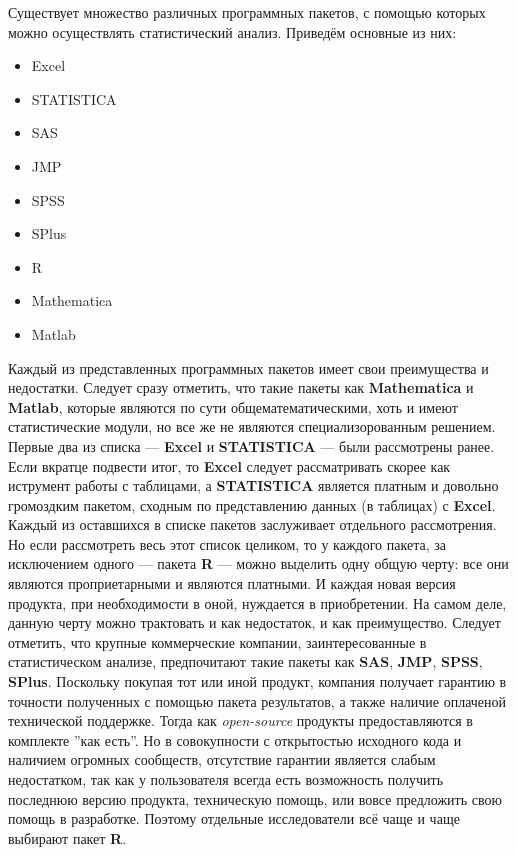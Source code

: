 Существует множество различных программных пакетов, с помощью которых можно осуществлять статистический анализ. Приведём основные из них:
\begin{itemize}
\item Excel
\item STATISTICA
\item SAS
\item JMP
\item SPSS
\item SPlus
\item R
\item Mathematica
\item Matlab
\end{itemize}
Каждый из представленных программных пакетов имеет свои преимущества и недостатки. Следует сразу отметить, что такие пакеты как \textbf{Mathematica} и \textbf{Matlab}, которые являются по сути общематематическими, хоть и имеют статистические модули, но все же не являются специализорованным решением. Первые два из списка --- \textbf{Excel} и \textbf{STATISTICA} --- были рассмотрены ранее. Если вкратце подвести итог, то \textbf{Excel} следует рассматривать скорее как иструмент работы с таблицами, а \textbf{STATISTICA} является платным и довольно громоздким пакетом, сходным по представлению данных (в таблицах) с \textbf{Excel}. Каждый из оставшихся в списке пакетов заслуживает отдельного рассмотрения. Но если рассмотреть весь этот список целиком, то у каждого пакета, за исключением одного --- пакета \textbf{R} --- можно выделить одну общую черту: все они являются проприетарными и являются платными. И каждая новая версия продукта, при необходимости в оной, нуждается в приобретении. На самом деле, данную черту можно трактовать и как недостаток, и как преимущество. Следует отметить, что крупные коммерческие компании, заинтересованные в статистическом анализе, предпочитают такие пакеты как \textbf{SAS}, \textbf{JMP}, \textbf{SPSS}, \textbf{SPlus}. Поскольку покупая тот или иной продукт, компания получает гарантию в точности полученных с помощью пакета результатов, а также наличие оплаченой технической поддержке. Тогда как \textit{open-source} продукты предоставляются в комплекте ''как есть''. Но в совокупности с открытостью исходного кода и наличием огромных сообществ, отсутствие гарантии является слабым недостатком, так как у пользователя всегда есть возможность получить последнюю версию продукта, техническую помощь, или вовсе предложить свою помощь в разработке. Поэтому отдельные исследователи всё чаще и чаще выбирают пакет \textbf{R}.

